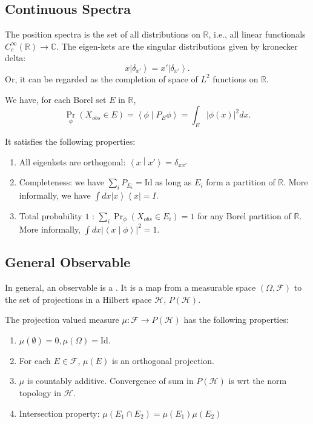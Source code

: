 
\subsection{Continuous Spectra}

The position spectra is the set of all distributions on $\mathbb{R}$, i.e., all linear functionals $C_c^{\infty }(\mathbb{R}) \to \mathbb{C}$. The eigen-kets are the singular distributions given by kronecker delta:
\[
	x \left| \delta_{x'} \right\rangle  = x' \left| \delta_{x'} \right\rangle 
.\] 
Or, it can be regarded as the completion of space of $L^2$ functions on $\mathbb{R}$.

We have, for each Borel set $E$ in $\mathbb{R}$,
\[
	\operatorname{Pr} _{\phi}(X_{obs} \in E) = \left\langle \phi \middle| P_E \phi \right\rangle 
	= \int _E |\phi(x)|^2 dx
.\] 

It satisfies the following properties:
\begin{enumerate}
	\item All eigenkets are orthogonal: $\left\langle x \middle| x' \right\rangle  = \delta_{x x'}$ 
	\item Completeness: we have $\sum_i P_{E_i} = \text{Id}$ as long as $E_i$ form a partition of $\mathbb{R}$. More informally, we have $\int dx \left| x \right\rangle \left\langle x \right|  = I$.
	\item Total probability $1$ : $\sum_i \operatorname{Pr} _{\phi} \left( X_{obs } \in E_i \right)  = 1$ for any Borel partition of $\mathbb{R}$. More informally, $\int dx \left|\left\langle x \middle| \phi \right\rangle\right|^2 = 1$.
\end{enumerate}

\subsection{General Observable}

In general, an observable is a  . It is a map from a measurable space $(\Omega, \mathcal{F})$ to the set of projections in a Hilbert space $\mathcal{H}$, $P(\mathcal{H})$.

The projection valued measure $\mu : \mathcal{F} \to P(\mathcal{H})$ has the following properties:
\begin{enumerate}
	\item $\mu(\emptyset ) = 0, \mu(\Omega) = \text{Id}$.
	\item For each $E \in \mathcal{F}$, $\mu(E)$ is an orthogonal projection.
	\item $\mu$ is countably additive. Convergence of sum in $P(\mathcal{H})$ is wrt the norm topology in $\mathcal{H}$.
	\item Intersection property: $\mu(E_1 \cap E_2) = \mu(E_1) \mu(E_2)$
\end{enumerate}

